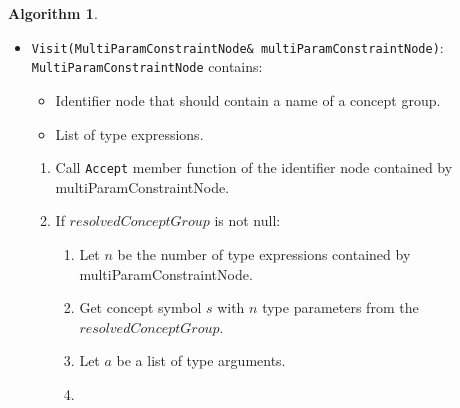 \documentclass[a4paper,oneside,11pt]{book}
\theoremstyle{definition}
\newtheorem{algo}{Algorithm}[section]
\begin{document}
\begin{algo}
\begin{itemize}
\begin{enumerate}
\begin{enumerate}
Let $a$ be a list of type arguments.
\item
Add $leftType$ to $a$.
\item
Compute a 16-byte $conceptId$ using algorithm \ref{computeconceptid} for the concept symbol $s$ and list of type arguments $a$.
\item
Lookup $conceptId$ from the concept repository (section \ref{conceptrepository}).
\item
If found, push \textbf{true} to the constraint check stack,
and push a bound constraint cloned from the bound constraint contained by the instantiated concept to the stack of bound constraints.
and return.
\item
Otherwise, instantiate concept $s$ with type arguments $a$ using algorithm \ref{instantiateconcept}.
Let $c$ be the instantiated concept.
\item
If $c$ is not null, add $c$ to the concept repository with id $conceptId$, push \textbf{true} to the constraint check stack,
push a bound constraint corresponding to $c$ to the stack of bound constraints, and return.
\item
Otherwise, push \textbf{false} to the constraint check stack, push \verb|BoundAtomicConstraint| with value \textbf{false}
to the stack of bound constraints.
\end{enumerate}
\end{enumerate}
\item
\verb|Visit(MultiParamConstraintNode& multiParamConstraintNode)|:\\
\verb|MultiParamConstraintNode| contains:
\begin{itemize}
\item
Identifier node that should contain a name of a concept group.
\item
List of type expressions.
\end{itemize}
\begin{enumerate}
\item
Call \verb|Accept| member function of the identifier node contained by multiParamConstraintNode.
\item
If $resolvedConceptGroup$ is not null:
\begin{enumerate}
\item
Let $n$ be the number of type expressions contained by multiParamConstraintNode.
\item
Get concept symbol $s$ with $n$ type parameters from the $resolvedConceptGroup$.
\item
Let $a$ be a list of type arguments.
\item

\end{enumerate}
\end{enumerate}
\end{itemize}
\end{algo}
\end{document}
